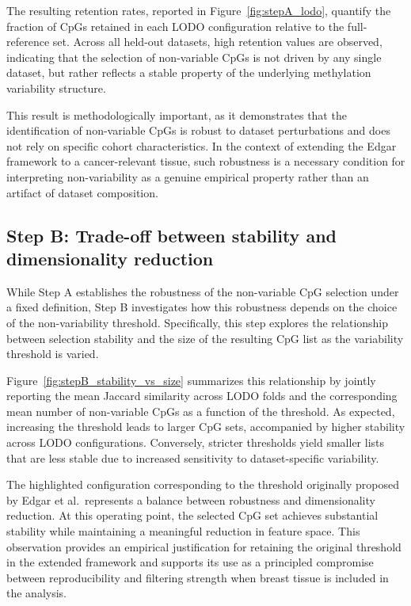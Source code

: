 \documentclass[10pt]{extarticle}
\begin{document}
The resulting retention rates, reported in Figure~\ref{fig:stepA_lodo}, quantify the fraction of CpGs retained in each LODO configuration relative to the full-reference set. Across all held-out datasets, high retention values are observed, indicating that the selection of non-variable CpGs is not driven by any single dataset, but rather reflects a stable property of the underlying methylation variability structure.

This result is methodologically important, as it demonstrates that the identification of non-variable CpGs is robust to dataset perturbations and does not rely on specific cohort characteristics. In the context of extending the Edgar framework to a cancer-relevant tissue, such robustness is a necessary condition for interpreting non-variability as a genuine empirical property rather than an artifact of dataset composition.

\subsection{Step B: Trade-off between stability and dimensionality reduction}

While Step A establishes the robustness of the non-variable CpG selection under a fixed definition, Step B investigates how this robustness depends on the choice of the non-variability threshold. Specifically, this step explores the relationship between selection stability and the size of the resulting CpG list as the variability threshold is varied.

Figure~\ref{fig:stepB_stability_vs_size} summarizes this relationship by jointly reporting the mean Jaccard similarity across LODO folds and the corresponding mean number of non-variable CpGs as a function of the threshold. As expected, increasing the threshold leads to larger CpG sets, accompanied by higher stability across LODO configurations. Conversely, stricter thresholds yield smaller lists that are less stable due to increased sensitivity to dataset-specific variability.

The highlighted configuration corresponding to the threshold originally proposed by Edgar et al.~represents a balance between robustness and dimensionality reduction. At this operating point, the selected CpG set achieves substantial stability while maintaining a meaningful reduction in feature space. This observation provides an empirical justification for retaining the original threshold in the extended framework and supports its use as a principled compromise between reproducibility and filtering strength when breast tissue is included in the analysis.
\end{document}
